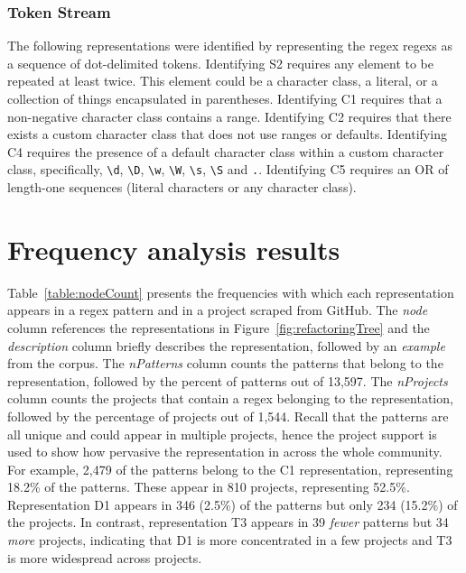 \subsubsection{Token Stream }
The following representations were identified by representing the regex regexs as a sequence of dot-delimited tokens.
Identifying S2 requires any element to be repeated at least twice. This element could be a character class, a literal, or a collection of things encapsulated in parentheses.
Identifying C1 requires that a non-negative character class contains a range.  Identifying C2 requires that there exists a custom character class that does not use ranges or defaults. Identifying C4 requires the presence of a default character class within a custom character class, specifically, \verb!\d!, \verb!\D!, \verb!\w!, \verb!\W!, \verb!\s!, \verb!\S! and \verb!.!.  Identifying C5 requires an OR of length-one sequences (literal characters or any character class).

\section{Frequency analysis results}


Table~\ref{table:nodeCount} presents the frequencies with which each representation appears in a regex pattern and in a project scraped from GitHub. The \emph{node} column references the representations in Figure~\ref{fig:refactoringTree} and the \emph{description} column briefly describes the representation, followed by an \emph{example} from the corpus. The \emph{nPatterns} column counts the patterns that belong to the representation, followed by the percent of patterns out of 13,597.
The \emph{nProjects} column counts the projects that contain a regex belonging to the representation,
followed by the percentage of projects out of 1,544.
Recall that the patterns are all unique and could appear in multiple projects, hence the project support is used to show how pervasive the representation in across the whole community.
For example, 2,479 of the patterns belong to the C1 representation, representing 18.2\% of the patterns. These appear in 810 projects, representing 52.5\%.
Representation D1 appears in 346 (2.5\%) of the patterns but only 234 (15.2\%) of the projects. In contrast, representation T3 appears in 39 \emph{fewer} patterns but 34 \emph{more} projects, indicating that D1 is more concentrated in a few projects and T3 is more widespread across projects.
